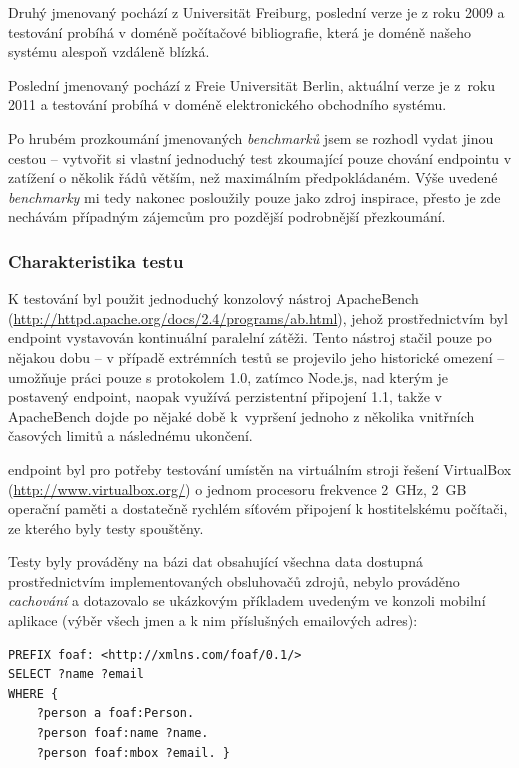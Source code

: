 Druhý jmenovaný pochází z Universität Freiburg, poslední verze je z roku 2009 a testování probíhá v doméně počítačové bibliografie, která je doméně našeho systému alespoň vzdáleně blízká.

Poslední jmenovaný pochází z Freie Universität Berlin, aktuální verze je z~roku 2011 a testování probíhá v doméně elektronického obchodního systému.

Po hrubém prozkoumání jmenovaných \textit{benchmarků} jsem se rozhodl vydat jinou cestou -- vytvořit si vlastní jednoduchý test zkoumající pouze chování  endpointu v zatížení o několik řádů větším, než maximálním předpokládaném. Výše uvedené \textit{benchmarky} mi tedy nakonec posloužily pouze jako zdroj inspirace, přesto je zde nechávám případným zájemcům pro pozdější podrobnější přezkoumání.

\subsubsection{Charakteristika testu}
K testování byl použit jednoduchý konzolový nástroj ApacheBench (\url{http://httpd.apache.org/docs/2.4/programs/ab.html}), jehož prostřednictvím byl  endpoint vystavován kontinuální paralelní zátěži. Tento nástroj stačil pouze po nějakou dobu -- v případě extrémních testů se projevilo jeho historické omezení -- umožňuje práci pouze s protokolem  1.0, zatímco Node.js, nad kterým je postavený  endpoint, naopak využívá perzistentní připojení  1.1, takže v ApacheBench dojde po nějaké době k~vypršení jednoho z několika vnitřních časových limitů a následnému ukončení.

 endpoint byl pro potřeby testování umístěn na virtuálním stroji řešení VirtualBox (\url{http://www.virtualbox.org/}) o jednom procesoru frekvence 2~GHz, 2~GB operační paměti a dostatečně rychlém síťovém připojení k hostitelskému počítači, ze kterého byly testy spouštěny.

Testy byly prováděny na bázi dat obsahující všechna data dostupná prostřednictvím implementovaných obsluhovačů zdrojů, nebylo prováděno \textit{cachování} a dotazovalo se ukázkovým příkladem uvedeným ve  konzoli mobilní aplikace (výběr všech jmen a k nim příslušných emailových adres):
\begin{verbatim}
PREFIX foaf: <http://xmlns.com/foaf/0.1/>
SELECT ?name ?email
WHERE {
    ?person a foaf:Person.
    ?person foaf:name ?name.
    ?person foaf:mbox ?email. }
\end{verbatim}

